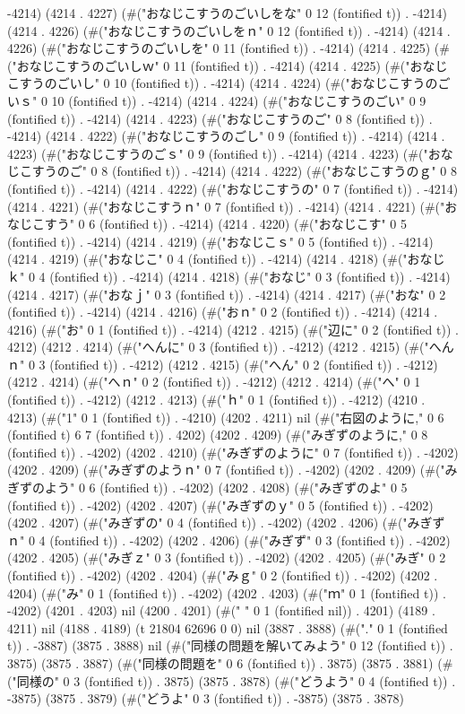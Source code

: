 -4214) (4214 . 4227) (#("おなじこすうのごいしをな" 0 12 (fontified t)) . -4214) (4214 . 4226) (#("おなじこすうのごいしをｎ" 0 12 (fontified t)) . -4214) (4214 . 4226) (#("おなじこすうのごいしを" 0 11 (fontified t)) . -4214) (4214 . 4225) (#("おなじこすうのごいしｗ" 0 11 (fontified t)) . -4214) (4214 . 4225) (#("おなじこすうのごいし" 0 10 (fontified t)) . -4214) (4214 . 4224) (#("おなじこすうのごいｓ" 0 10 (fontified t)) . -4214) (4214 . 4224) (#("おなじこすうのごい" 0 9 (fontified t)) . -4214) (4214 . 4223) (#("おなじこすうのご" 0 8 (fontified t)) . -4214) (4214 . 4222) (#("おなじこすうのごし" 0 9 (fontified t)) . -4214) (4214 . 4223) (#("おなじこすうのごｓ" 0 9 (fontified t)) . -4214) (4214 . 4223) (#("おなじこすうのご" 0 8 (fontified t)) . -4214) (4214 . 4222) (#("おなじこすうのｇ" 0 8 (fontified t)) . -4214) (4214 . 4222) (#("おなじこすうの" 0 7 (fontified t)) . -4214) (4214 . 4221) (#("おなじこすうｎ" 0 7 (fontified t)) . -4214) (4214 . 4221) (#("おなじこすう" 0 6 (fontified t)) . -4214) (4214 . 4220) (#("おなじこす" 0 5 (fontified t)) . -4214) (4214 . 4219) (#("おなじこｓ" 0 5 (fontified t)) . -4214) (4214 . 4219) (#("おなじこ" 0 4 (fontified t)) . -4214) (4214 . 4218) (#("おなじｋ" 0 4 (fontified t)) . -4214) (4214 . 4218) (#("おなじ" 0 3 (fontified t)) . -4214) (4214 . 4217) (#("おなｊ" 0 3 (fontified t)) . -4214) (4214 . 4217) (#("おな" 0 2 (fontified t)) . -4214) (4214 . 4216) (#("おｎ" 0 2 (fontified t)) . -4214) (4214 . 4216) (#("お" 0 1 (fontified t)) . -4214) (4212 . 4215) (#("辺に" 0 2 (fontified t)) . 4212) (4212 . 4214) (#("へんに" 0 3 (fontified t)) . -4212) (4212 . 4215) (#("へんｎ" 0 3 (fontified t)) . -4212) (4212 . 4215) (#("へん" 0 2 (fontified t)) . -4212) (4212 . 4214) (#("へｎ" 0 2 (fontified t)) . -4212) (4212 . 4214) (#("へ" 0 1 (fontified t)) . -4212) (4212 . 4213) (#("ｈ" 0 1 (fontified t)) . -4212) (4210 . 4213) (#("1" 0 1 (fontified t)) . -4210) (4202 . 4211) nil (#("右図のように," 0 6 (fontified t) 6 7 (fontified t)) . 4202) (4202 . 4209) (#("みぎずのように," 0 8 (fontified t)) . -4202) (4202 . 4210) (#("みぎずのように" 0 7 (fontified t)) . -4202) (4202 . 4209) (#("みぎずのようｎ" 0 7 (fontified t)) . -4202) (4202 . 4209) (#("みぎずのよう" 0 6 (fontified t)) . -4202) (4202 . 4208) (#("みぎずのよ" 0 5 (fontified t)) . -4202) (4202 . 4207) (#("みぎずのｙ" 0 5 (fontified t)) . -4202) (4202 . 4207) (#("みぎずの" 0 4 (fontified t)) . -4202) (4202 . 4206) (#("みぎずｎ" 0 4 (fontified t)) . -4202) (4202 . 4206) (#("みぎず" 0 3 (fontified t)) . -4202) (4202 . 4205) (#("みぎｚ" 0 3 (fontified t)) . -4202) (4202 . 4205) (#("みぎ" 0 2 (fontified t)) . -4202) (4202 . 4204) (#("みｇ" 0 2 (fontified t)) . -4202) (4202 . 4204) (#("み" 0 1 (fontified t)) . -4202) (4202 . 4203) (#("ｍ" 0 1 (fontified t)) . -4202) (4201 . 4203) nil (4200 . 4201) (#(" " 0 1 (fontified nil)) . 4201) (4189 . 4211) nil (4188 . 4189) (t 21804 62696 0 0) nil (3887 . 3888) (#("." 0 1 (fontified t)) . -3887) (3875 . 3888) nil (#("同様の問題を解いてみよう" 0 12 (fontified t)) . 3875) (3875 . 3887) (#("同様の問題を" 0 6 (fontified t)) . 3875) (3875 . 3881) (#("同様の" 0 3 (fontified t)) . 3875) (3875 . 3878) (#("どうよう" 0 4 (fontified t)) . -3875) (3875 . 3879) (#("どうよ" 0 3 (fontified t)) . -3875) (3875 . 3878) 
